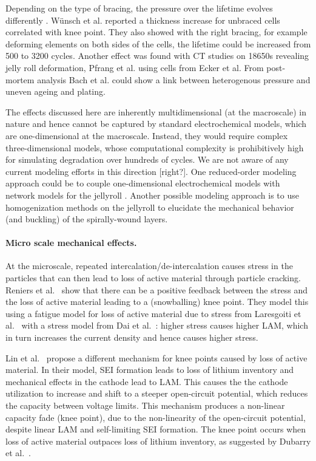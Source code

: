 \documentclass{article}
\newcommand{\pbox}[1]{{
\fbox{
\parbox{0.8\textwidth}{  \fbox{$\triangleright$\textcolor{blue}{\textbf{From Peter}:}} 
#1
}}}}
\begin{document}
Depending on the type of bracing, the pressure over the lifetime evolves differently . Wünsch et al. \cite{wunsch_investigation_2019} reported a thickness increase for unbraced cells correlated with knee point. They also showed with the right bracing, for example deforming elements on both sides of the cells, the lifetime could be increased from 500 to 3200 cycles.
Another effect was found with CT studies on 18650s revealing jelly roll deformation, Pfrang et al. \cite{pfrang_long-term_2018} using cells from Ecker et al. \cite{ecker_calendar_2014}
From post-mortem analysis Bach et al. could show a link between heterogenous pressure and uneven ageing and plating\cite{bach_nonlinear_2016}.

The effects discussed here are inherently multidimensional (at the macroscale) in nature and hence cannot be captured by standard electrochemical models, which are one-dimensional at the macroscale. Instead, they would require complex three-dimensional models, whose computational complexity is prohibitively high for simulating degradation over hundreds of cycles. We are not aware of any current modeling efforts in this direction [right?]. One reduced-order modeling approach could be to couple one-dimensional electrochemical models with network models for the jellyroll \cite{tranter_probing_2020}.  Another possible modeling approach is to use homogenization methods on the jellyroll \cite{psaltis_homogenisation_2020} to elucidate the mechanical behavior (and buckling) of the spirally-wound layers.

\paragraph{Micro scale mechanical effects.}


\pbox{
Add covering layer stuff
}

At the microscale, repeated intercalation/de-intercalation causes stress in the particles that can then lead to loss of active material through particle cracking.
Reniers et al.~\cite{reniers_review_2019} show that there can be a positive feedback between the stress and the loss of active material leading to a (snowballing) knee point. They model this using a fatigue model for loss of active material due to stress from Laresgoiti et al.~\cite{laresgoiti_modeling_2015} with a stress model from Dai et al.~\cite{dai_simulation_2014}: higher stress causes higher LAM, which in turn increases the current density and hence causes higher stress.

Lin et al.~\cite{lin_comprehensive_2013} propose a different mechanism for knee points caused by loss of active material. In their model, SEI formation leads to loss of lithium inventory and mechanical effects in the cathode lead to LAM. This causes the the cathode utilization to increase and shift to a steeper open-circuit potential, which reduces the capacity between voltage limits. This mechanism produces a non-linear capacity fade (knee point), due to the non-linearity of the open-circuit potential, despite linear LAM and self-limiting SEI formation. The knee point occurs when loss of active material outpaces loss of lithium inventory, as suggested by Dubarry et al.~\cite{dubarry_durability_2018}.
\end{document}
